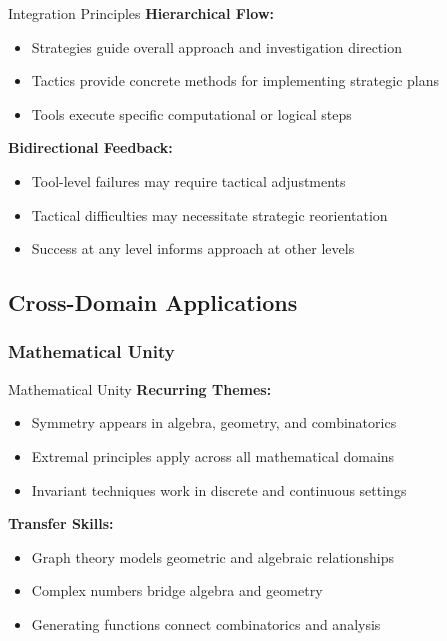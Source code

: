\documentclass[12pt]{article}
\begin{document}
	\begin{strategybox}{Integration Principles}
		\textbf{Hierarchical Flow:}
		\begin{itemize}
			\item Strategies guide overall approach and investigation direction
			\item Tactics provide concrete methods for implementing strategic plans
			\item Tools execute specific computational or logical steps
		\end{itemize}
		
		\textbf{Bidirectional Feedback:}
		\begin{itemize}
			\item Tool-level failures may require tactical adjustments
			\item Tactical difficulties may necessitate strategic reorientation
			\item Success at any level informs approach at other levels
		\end{itemize}
	\end{strategybox}
	
	\subsection{Cross-Domain Applications}
	
	\subsubsection{Mathematical Unity}
	
	\begin{tacticsbox}{Mathematical Unity}
		\textbf{Recurring Themes:}
		\begin{itemize}
			\item Symmetry appears in algebra, geometry, and combinatorics
			\item Extremal principles apply across all mathematical domains
			\item Invariant techniques work in discrete and continuous settings
		\end{itemize}
		
		\textbf{Transfer Skills:}
		\begin{itemize}
			\item Graph theory models geometric and algebraic relationships
			\item Complex numbers bridge algebra and geometry
			\item Generating functions connect combinatorics and analysis
		\end{itemize}
	\end{tacticsbox}
	
\end{document}
